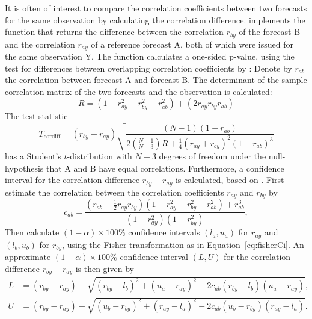 \documentclass[article]{jss}\usepackage{graphicx, color}
\begin{document}
It is often of interest to compare the correlation coefficients between two forecasts for the same observation by calculating the correlation difference.
 implements the function  that returns the difference between the correlation $r_{by}$ of the forecast B and the correlation $r_{ay}$ of a reference forecast A, both of which were issued for the same observation Y.
The function calculates a one-sided p-value, using the test for differences between overlapping correlation coefficients by \citet{steiger1980tests}:
Denote by $r_{ab}$ the correlation between forecast A and forecast B.
The determinant of the sample correlation matrix of the two forecasts and the observation is calculated:
%
\begin{equation}
R  = (1 - r_{ay}^2 - r_{by}^2 - r_{ab}^2) + (2 r_{ay} r_{by} r_{ab})
\end{equation}
%
The test statistic
%
\begin{equation}
T_{\text{cordiff}}  = (r_{by} - r_{ay}) \sqrt{\frac{(N-1)(1+r_{ab})}{2\left(\frac{N-1}{N-3}\right) R+\frac{1}{4}(r_{ay}+r_{by})^2 (1-r_{ab})^3}}\label{eq:T2}
\end{equation}
%
has a Student's $t$-distribution with $N-3$ degrees of freedom under the null-hypothesis that A and B have equal correlations.
Furthermore, a confidence interval for the correlation difference $r_{by}-r_{ay}$ is calculated, based on \citet{zou2007toward}.
First estimate the correlation between the correlation coefficients $r_{ay}$ and $r_{by}$ by
%
\begin{equation}
c_{ab} = \frac{\left(r_{ab} - \frac{1}{2}  r_{ay}  r_{by}\right)  \left(1 - r_{ay}^2 - r_{by}^2 - r_{ab}^2\right) + r_{ab}^3}{(1-r_{ay}^2)(1-r_{by}^2)},
\end{equation}
%
Then calculate $(1-\alpha)\times 100\%$ confidence intervals $(l_a, u_a)$ for $r_{ay}$ and $(l_b, u_b)$ for $r_{by}$, using the Fisher transformation as in Equation~\ref{eq:fisherCi}.
An approximate $(1-\alpha)\times 100\%$ confidence interval $(L,U)$ for the correlation difference $r_{by} - r_{ay}$ is then given by
%
\begin{align}
L & = (r_{by} - r_{ay}) - \sqrt{(r_{by} - l_b)^2 + (u_a-r_{ay})^2 - 2  c_{ab}  (r_{by} - l_b) 
(u_a - r_{ay})},\nonumber\\
U & =  (r_{by} - r_{ay}) + \sqrt{(u_{b} - r_{by})^2 + (r_{ay}-l_a)^2 - 2 c_{ab} (u_b-r_{by})(r_{ay}-l_a)}.\label{eq:zou}
\end{align}
\end{document}
